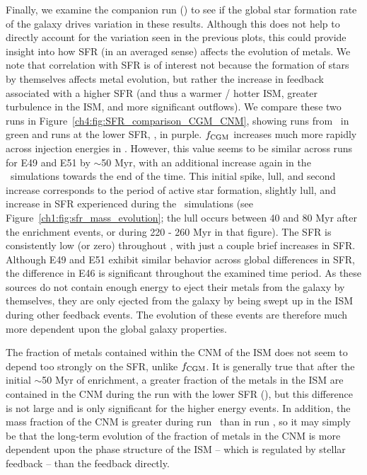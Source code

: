Finally, we examine the companion run (\runtwonu) to see if the global star formation rate of the galaxy drives variation in these results. Although this does not help to directly account for the variation seen in the previous plots, this could provide insight into how SFR (in an averaged sense) affects the evolution of metals. We note that correlation with SFR is of interest not because the formation of stars by themselves affects metal evolution, but rather the increase in feedback associated with a higher SFR (and thus a warmer / hotter ISM, greater turbulence in the ISM, and more significant outflows). We compare these two runs in Figure~\ref{ch4:fig:SFR_comparison_CGM_CNM}, showing runs from \runonenu~in green and runs at the lower SFR, \runtwonu, in purple. $f_{\rm CGM}$ increases much more rapidly across injection energies in \runonenu. However, this value seems to be similar across runs for E49 and E51 by $\sim$50 Myr, with an additional increase again in the \runonenu~simulations towards the end of the time. This initial spike, lull, and second increase corresponds to the period of active star formation, slightly lull, and increase in SFR experienced during the \runonenu~simulations (see Figure~\ref{ch1:fig:sfr_mass_evolution}; the lull occurs between 40 and 80 Myr after the enrichment events, or during 220 - 260 Myr in that figure). The SFR is consistently low (or zero) throughout \runtwonu, with just a couple brief increases in SFR. Although E49 and E51 exhibit similar behavior across global differences in SFR, the difference in E46 is significant throughout the examined time period. As these sources do not contain enough energy to eject their metals from the galaxy by themselves, they are only ejected from the galaxy by being swept up in the ISM during other feedback events. The evolution of these events are therefore much more dependent upon the global galaxy properties.

The fraction of metals contained within the CNM of the ISM does not seem to depend too strongly on the SFR, unlike $f_{\rm CGM}$. It is generally true that after the initial $\sim$50 Myr of enrichment, a greater fraction of the metals in the ISM are contained in the CNM during the run with the lower SFR (\runtwonu), but this difference is not large and is only significant for the higher energy events. In addition, the mass fraction of the CNM is greater during run \runtwonu~than in run \runonenu, so it may simply be that the long-term evolution of the fraction of metals in the CNM is more dependent upon the phase structure of the ISM -- which is regulated by stellar feedback -- than the feedback directly.

